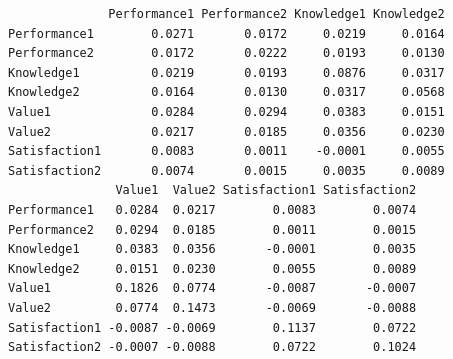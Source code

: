 \begin{Shaded}
\begin{Highlighting}[]
                        \NormalTok{,   }\NormalTok{,}
                        \NormalTok{,   }\NormalTok{,}
                        \NormalTok{, }\NormalTok{)}
\NormalTok{                      , }\NormalTok{(}\NormalTok{,   }\NormalTok{,}
                          \NormalTok{, }\NormalTok{,}
                          \NormalTok{, }\NormalTok{,}
                          \NormalTok{, }\NormalTok{)}
\NormalTok{    )}

\NormalTok{  )}

\end{Highlighting}
\end{Shaded}

\begin{verbatim}
              Performance1 Performance2 Knowledge1 Knowledge2
Performance1        0.0271       0.0172     0.0219     0.0164
Performance2        0.0172       0.0222     0.0193     0.0130
Knowledge1          0.0219       0.0193     0.0876     0.0317
Knowledge2          0.0164       0.0130     0.0317     0.0568
Value1              0.0284       0.0294     0.0383     0.0151
Value2              0.0217       0.0185     0.0356     0.0230
Satisfaction1       0.0083       0.0011    -0.0001     0.0055
Satisfaction2       0.0074       0.0015     0.0035     0.0089
               Value1  Value2 Satisfaction1 Satisfaction2
Performance1   0.0284  0.0217        0.0083        0.0074
Performance2   0.0294  0.0185        0.0011        0.0015
Knowledge1     0.0383  0.0356       -0.0001        0.0035
Knowledge2     0.0151  0.0230        0.0055        0.0089
Value1         0.1826  0.0774       -0.0087       -0.0007
Value2         0.0774  0.1473       -0.0069       -0.0088
Satisfaction1 -0.0087 -0.0069        0.1137        0.0722
Satisfaction2 -0.0007 -0.0088        0.0722        0.1024
\end{verbatim}

